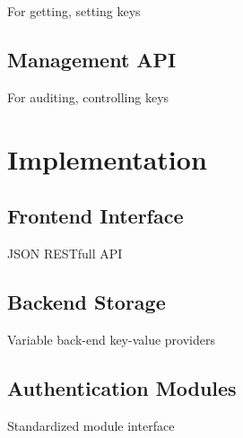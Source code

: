 For getting, setting keys

\subsection{Management API}

For auditing, controlling keys

\section{Implementation}

\subsection{Frontend Interface}

JSON RESTfull API

\subsection{Backend Storage}

Variable back-end key-value providers

\subsection{Authentication Modules}

Standardized module interface
